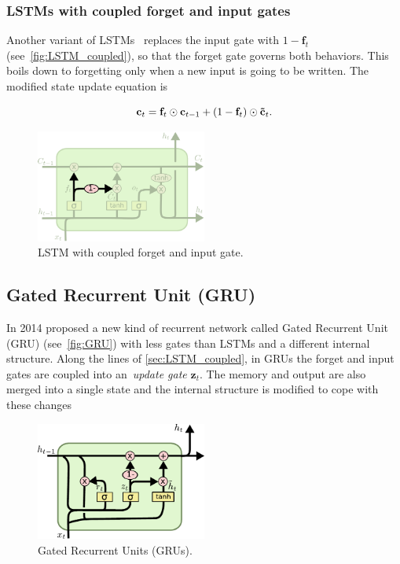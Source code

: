 \subsubsection{LSTMs with coupled forget and input gates}\label{sec:LSTM_coupled}

Another variant of LSTMs~\citep{Greff-et-al-arxiv2015} replaces the input gate
with $1 - \mathbf{f}_t$ (see~\autoref{fig:LSTM_coupled}), so that the forget
gate governs both behaviors. This boils down to forgetting only when a new
input is going to be written. The modified state update equation is

\begin{equation}\label{eq:LSTM_coupled}
    \mathbf{c}_t = \mathbf{f}_t \odot \mathbf{c}_{t-1} + (1 - \mathbf{f}_t)
        \odot \mathbf{\tilde c}_t.
\end{equation}

\begin{figure}[p]
    \centering
    \includegraphics[width=0.5\textwidth]{pdf/LSTM_coupled.pdf}
    \caption{LSTM with coupled forget and input gate.\label{fig:LSTM_coupled}}
\end{figure}


\subsection{Gated Recurrent Unit (GRU)}\label{sec:GRU}

In 2014 \cite{Cho2014a} proposed a new kind of recurrent network called Gated
Recurrent Unit (GRU) (see~\autoref{fig:GRU}) with less gates than LSTMs and a
different internal structure. Along the lines of \autoref{sec:LSTM_coupled}, in
GRUs the forget and input gates are coupled into an~\emph{update gate}
$\mathbf{z}_t$.  The memory and output are also merged into a single state and
the internal structure is modified to cope with these changes

\begin{figure}[p]
    \centering
    \includegraphics[width=0.5\textwidth]{pdf/GRU.pdf}
    \caption{Gated Recurrent Units (GRUs).\label{fig:GRU}}
\end{figure}

